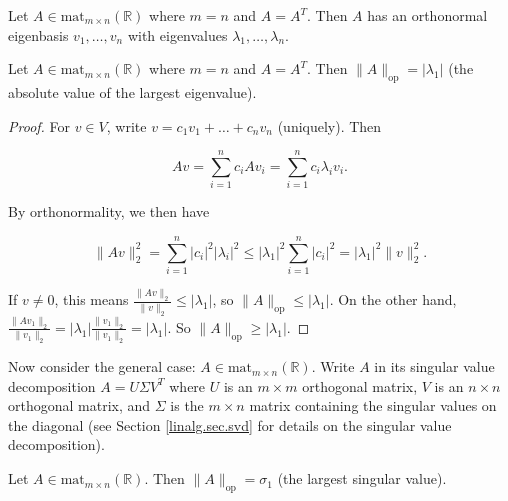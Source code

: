 \begin{theorem}

Let \(A \in \text{mat}_{m \times n} (\mathbb{R})\) where \(m=n\) and \(A = A^T\). Then \(A\) has an orthonormal eigenbasis \(v_1, \ldots, v_n\) with eigenvalues \(\lambda_1, \ldots, \lambda_n\). 

\end{theorem}

\begin{proposition}

Let \(A \in \text{mat}_{m \times n} (\mathbb{R})\) where \(m=n\) and \(A = A^T\). Then \(\lVert A \rVert_\text{op} = | \lambda_1|\) (the absolute value of the largest eigenvalue).

\end{proposition}

\begin{proof}

For \(v \in V\), write \(v= c_1 v_1 + \ldots + c_n v_n\) (uniquely). Then

\[
Av = \sum_{i=1}^n c_i A v_i =  \sum_{i=1}^n c_i \lambda_i v_i .
\]

By orthonormality, we then have 

\[
\lVert A v \rVert_2^2 = \sum_{i=1}^n |c_i|^2 |\lambda_i|^2  \leq  |\lambda_1|^2 \sum_{i=1}^n   |c_i|^2  =  |\lambda_1|^2  \lVert v \rVert_2^2.
\]

If \(v \neq 0\), this means \( \frac{\lVert A v \rVert_2}{ \lVert v \rVert_2} \leq | \lambda_1|\), so \(\lVert A \rVert_{\text{op}} \leq | \lambda_1|\). On the other hand, \( \frac{\lVert A v_1 \rVert_2}{ \lVert v_1 \rVert_2} = |\lambda_1| \frac{ \lVert v_1 \rVert_2}{\lVert v_1 \rVert_2} = |\lambda_1|\). So \(\lVert A \rVert_{\text{op}} \geq | \lambda_1|\).

\end{proof}

Now consider the general case: \(A \in \text{mat}_{m \times n} (\mathbb{R})\). Write \(A\) in its singular value decomposition \(A = U \Sigma V^T\) where \(U\) is an \(m \times m\) orthogonal matrix, \(V\) is an \(n \times n\) orthogonal matrix, and \(\Sigma\) is the \(m \times n\) matrix containing the singular values on the diagonal (see Section \ref{linalg.sec.svd} for details on the singular value decomposition).

\begin{proposition}

Let \(A \in \text{mat}_{m \times n} (\mathbb{R})\). Then \(\lVert A \rVert_\text{op} =  \sigma_1\) (the largest singular value).

\end{proposition}

